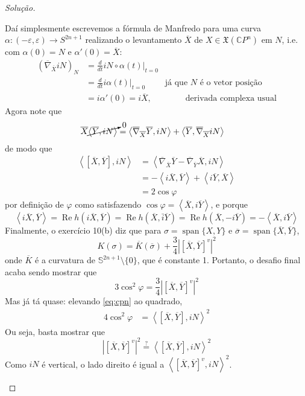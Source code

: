 \begin{proof}[Solução]
\begin{enumerate}[label=(\alph*)]
	Daí simplesmente escrevemos a fórmula de Manfredo para uma curva \(\alpha:(-\varepsilon,\varepsilon)\to S^{2n+1}\) realizando o levantamento \(\overline{X}\) de \(X \in \mathfrak{X}(\mathbb{C}P^{n})\) em \(N\), i.e. com \(\alpha(0)=N\) e \(\alpha'(0)=\overline{X}\):
	\begin{align*}
		(\overline{\nabla}_{\overline{X}}i N)_N&=\frac{d}{dt}i N \circ \alpha(t)\Big|_{t=0}\\
		&=\frac{d}{dt}i \alpha(t)\Big|_{t=0}\qquad  \text{ já que \(N\) é o vetor posição} \\
		&=i \alpha'(0)=i\overline{X}, \qquad \qquad \text{derivada complexa usual} 
	\end{align*}
	Agora note que
	\begin{align*}
	\overline{X}\cancelto{0}{\left<\overline{Y},iN\right>}&=\left<\overline{\nabla}_{\overline{X}}\overline{Y},i N\right>+\left<\overline{Y},\overline{\nabla}_{\overline{X}}i N\right>
	\end{align*}
	de modo que
	\begin{equation}\label{eq:cpn}
		\begin{aligned}
	\left<[\overline{X},\overline{Y}],i N\right>&=\left<\overline{\nabla}_{\overline{X}}\overline{Y}-\overline{\nabla}_{\overline{Y}}\overline{X},i N\right>\\
	&=-\left<i \overline{X},\overline{Y}\right>+\left<i \overline{Y},\overline{X}\right>\\
	&=2 \cos \varphi\end{aligned}
	\end{equation}
por definição de \(\varphi\) como satisfazendo \(\cos \varphi=\left<\overline{X},i \overline{Y}\right>\), e porque \[\left<i \overline{X},\overline{Y}\right>=\operatorname{Re}h(i\overline{X},\overline{Y})=\operatorname{Re}h(\overline{X},\bar{i} \overline{Y} )=\operatorname{Re}h(\overline{X},-i \overline{Y} )=-\left<\overline{X},i \overline{Y}\right>\]
Finalmente, o exercício 10(b) diz que para \(\sigma=\operatorname{span}\{X,Y\}\) e \(\overline{\sigma}=\operatorname{span}\{\overline{X}, \overline{Y}\}\),
\[K(\sigma)=\overline{K}(\overline{\sigma})+\frac{3}{4}\left|\left[ \overline{X},\overline{Y} \right]^v\right|^2\]
onde \(\overline{K}\) é a curvatura de \(\mathbb{S}^{2n+1}\setminus\{0\}\), que é constante 1. Portanto, o desafio final acaba sendo mostrar que
\[3 \cos^2 \varphi=\frac{3}{4}\left|\left[ \overline{X},\overline{Y} \right]^v\right|^2\]
Mas já tá quase: elevando \cref{eq:cpn} ao quadrado,
\begin{align*}
4\cos^2\varphi&=\left<\left[ \overline{X},\overline{Y} \right] ,i N\right>^2
\end{align*}
Ou seja, basta mostrar que
\[\left|\left[ \overline{X},\overline{Y} \right]^v\right|^2\overset{?}{=}\left<\left[ \overline{X},\overline{Y} \right],i N\right>^2\]
Como \(i N\) é vertical, o lado direito é igual a \(\left<\left[ \overline{X},\overline{Y} \right]^v, iN\right>^2\).


\end{enumerate}
\end{proof}

